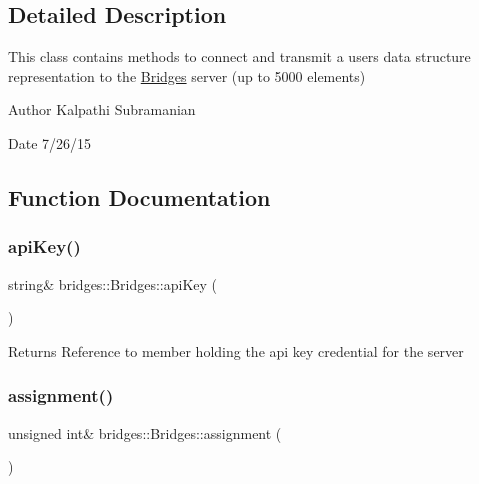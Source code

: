 \subsection{Detailed Description}
This class contains methods to connect and transmit a user\textquotesingle{}s data structure representation to the \hyperlink{namespacebridges_1_1_bridges}{Bridges} server (up to 5000 elements) 

\begin{DoxyAuthor}{Author}
Kalpathi Subramanian 
\end{DoxyAuthor}
\begin{DoxyDate}{Date}
7/26/15 
\end{DoxyDate}


\subsection{Function Documentation}
\hypertarget{namespacebridges_1_1_bridges_a4ec319d8c731624bd1aa0efa2427044e}{}\label{namespacebridges_1_1_bridges_a4ec319d8c731624bd1aa0efa2427044e} 
\subsubsection{\texorpdfstring{api\+Key()}{apiKey()}}
{\footnotesize\ttfamily string\& bridges\+::\+Bridges\+::api\+Key (\begin{DoxyParamCaption}{ }\end{DoxyParamCaption})}

\begin{DoxyReturn}{Returns}
Reference to member holding the api key credential for the server 
\end{DoxyReturn}
\hypertarget{namespacebridges_1_1_bridges_a97d6cfdc40ecead5d802ac2054933038}{}\label{namespacebridges_1_1_bridges_a97d6cfdc40ecead5d802ac2054933038} 
\subsubsection{\texorpdfstring{assignment()}{assignment()}}
{\footnotesize\ttfamily unsigned int\& bridges\+::\+Bridges\+::assignment (\begin{DoxyParamCaption}{ }\end{DoxyParamCaption})}

